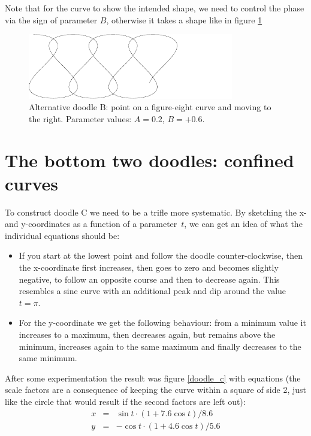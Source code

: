 \documentclass[onecolumn]{article}
\begin{document}
Note that for the curve to show the intended shape, we need to control the phase via the sign of parameter $B$, otherwise it takes a
shape like in figure \ref{doodle_b2}

\begin{figure}[H]
\caption{Alternative doodle B: point on a figure-eight curve and moving to the right. Parameter values: $A = 0.2$, $B = +0.6$.}
\label{doodle_b2}
\begin{center}
\includegraphics[width=0.8\textwidth]{doodle_b2.pdf}
\end{center}
\end{figure}

\section*{The bottom two doodles: confined curves}
To construct doodle C we need to be a trifle more systematic. By sketching the x- and y-coordinates as a function of a parameter~$t$,
we can get an idea of what the individual equations should be:
\begin{itemize}
\item
If you start at the lowest point and follow the doodle counter-clockwise, then the x-coordinate first increases, then goes to zero
and becomes slightly negative, to follow an opposite course and then to decrease again. This resembles a sine curve with an
additional peak and dip around the value $t = \pi$.
\item
For the y-coordinate we get the following behaviour: from a minimum value it increases to a maximum, then decreases again, but remains above the minimum,
increases again to the same maximum and finally decreases to the same minimum.
\end{itemize}

After some experimentation the result was figure \ref{doodle_c} with equations (the scale factors are a consequence of keeping the curve within a
square of side 2, just like the circle that would result if the second factors are left out):
\begin{eqnarray}
\nonumber x &=& \sin t \cdot (1 + 7.6 \cos t) / 8.6 \\
\nonumber y &=& -\cos t \cdot (1 + 4.6 \cos t) / 5.6
\end{eqnarray}
\end{document}
